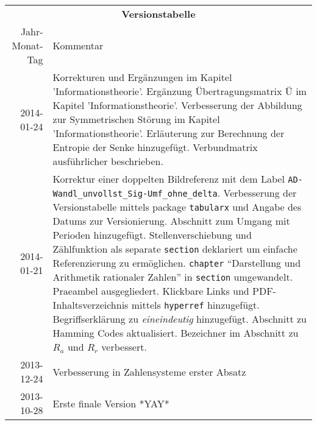 \begin{table}[htp]
\centering
\begin{tabularx}{\columnwidth}{rp{}}
\multicolumn{2}{c}{\textbf{Versionstabelle}} \\
Jahr-Monat-Tag & Kommentar \\ \hline
2014-01-24 & Korrekturen und Ergänzungen im Kapitel 'Informationstheorie'. 
Ergänzung Übertragungsmatrix $Ü$ im Kapitel 'Informationstheorie'.
Verbesserung der Abbildung zur Symmetrischen Störung im Kapitel 'Informationstheorie'.
Erläuterung zur Berechnung der Entropie der Senke hinzugefügt.
Verbundmatrix ausführlicher beschrieben.
\\
2014-01-21 & Korrektur einer doppelten Bildreferenz mit dem Label \texttt{AD-Wandl\_unvollst\_Sig-Umf\_ohne\_delta}.  
Verbesserung der Versionstabelle mittels package \texttt{tabularx} und Angabe des Datums zur Versionierung. 
Abschnitt zum Umgang mit Perioden hinzugefügt. 
Stellenverschiebung und Zählfunktion als separate \texttt{section} deklariert um einfache Referenzierung zu ermöglichen.
\texttt{chapter} "`Darstellung und Arithmetik rationaler Zahlen"' in \texttt{section} umgewandelt. 
Praeambel ausgegliedert.
Klickbare Links und PDF-Inhaltsverzeichnis mittels \texttt{hyperref} hinzugefügt.
Begriffserklärung zu \emph{eineindeutig} hinzugefügt.
Abschnitt zu Hamming Codes aktualisiert.
Bezeichner im Abschnitt zu $R_a$ und $R_r$ verbessert.
\\
2013-12-24 & Verbesserung in Zahlensysteme erster Absatz \\
2013-10-28 & Erste finale Version *YAY* \\
\end{tabularx}
\end{table}